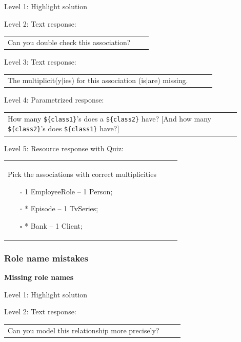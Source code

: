 \noindent Level 1: Highlight solution \medskip

\noindent Level 2: Text response: \medskip

\begin{tabular}{|p{0.9\linewidth}}
Can you double check this association?
\end{tabular} \medskip

\noindent Level 3: Text response: \medskip

\begin{tabular}{|p{0.9\linewidth}}
The multiplicit(y$|$ies) for this association (is$|$are) missing.
\end{tabular} \medskip

\noindent Level 4: Parametrized response: \medskip

\begin{tabular}{|p{0.9\linewidth}}
How many \verb|${class1}|'s does a \verb|${class2}| have? [And how many \verb|${class2}|'s does \verb|${class1}| have?]
\end{tabular} \medskip

\noindent Level 5: Resource response with Quiz: \medskip

\begin{tabular}{|p{0.9\linewidth}}
Pick the associations with correct multiplicities

\begin{itemize}
    \item[$\square$] 1 EmployeeRole -- 1 Person;
    \item[$\square$] * Episode -- 1 TvSeries;
    \item[$\square$] * Bank -- 1 Client;
\end{itemize}

\end{tabular} \medskip


\subsubsection{Role name mistakes}

\noindent \textbf{Missing role names} \medskip

\noindent Level 1: Highlight solution \medskip

\noindent Level 2: Text response: \medskip

\begin{tabular}{|p{0.9\linewidth}}
Can you model this relationship more precisely?
\end{tabular} \medskip

